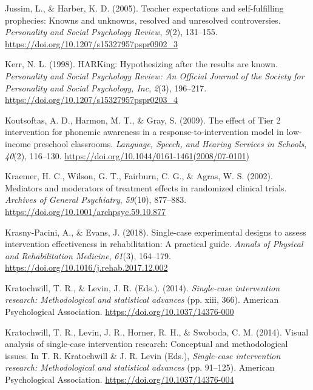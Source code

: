 \documentclass{krantz}
\newlength{\cslhangindent}
\newlength{\cslentryspacingunit} %
\newenvironment{CSLReferences}[2] %
{%
\setlength{\parindent}{0pt}
\ifodd #1
\let\oldpar\par
\def\par{\hangindent=\cslhangindent\oldpar}
\fi
\setlength{\parskip}{#2\cslentryspacingunit}
}%
{}
\begin{document}
\begin{CSLReferences}{1}{0}
\leavevmode{}%
Jussim, L., \& Harber, K. D. (2005). Teacher expectations and self-fulfilling prophecies: Knowns and unknowns, resolved and unresolved controversies. \emph{Personality and Social Psychology Review}, \emph{9}(2), 131--155. \url{https://doi.org/10.1207/s15327957pspr0902_3}

\leavevmode{}%
Kerr, N. L. (1998). {HARKing}: Hypothesizing after the results are known. \emph{Personality and Social Psychology Review: An Official Journal of the Society for Personality and Social Psychology, Inc}, \emph{2}(3), 196--217. \url{https://doi.org/10.1207/s15327957pspr0203_4}

\leavevmode{}%
Koutsoftas, A. D., Harmon, M. T., \& Gray, S. (2009). The effect of {Tier} 2 intervention for phonemic awareness in a response-to-intervention model in low-income preschool classrooms. \emph{Language, Speech, and Hearing Services in Schools}, \emph{40}(2), 116--130. \url{https://doi.org/10.1044/0161-1461(2008/07-0101)}

\leavevmode{}%
Kraemer, H. C., Wilson, G. T., Fairburn, C. G., \& Agras, W. S. (2002). Mediators and moderators of treatment effects in randomized clinical trials. \emph{Archives of General Psychiatry}, \emph{59}(10), 877--883. \url{https://doi.org/10.1001/archpsyc.59.10.877}

\leavevmode{}%
Krasny-Pacini, A., \& Evans, J. (2018). Single-case experimental designs to assess intervention effectiveness in rehabilitation: {A} practical guide. \emph{Annals of Physical and Rehabilitation Medicine}, \emph{61}(3), 164--179. \url{https://doi.org/10.1016/j.rehab.2017.12.002}

\leavevmode{}%
Kratochwill, T. R., \& Levin, J. R. (Eds.). (2014). \emph{Single-case intervention research: {Methodological} and statistical advances} (pp. xiii, 366). {American Psychological Association}. \url{https://doi.org/10.1037/14376-000}

\leavevmode{}%
Kratochwill, T. R., Levin, J. R., Horner, R. H., \& Swoboda, C. M. (2014). Visual analysis of single-case intervention research: {Conceptual} and methodological issues. In T. R. Kratochwill \& J. R. Levin (Eds.), \emph{Single-case intervention research: {Methodological} and statistical advances} (pp. 91--125). {American Psychological Association}. \url{https://doi.org/10.1037/14376-004}


\end{CSLReferences}
\end{document}

